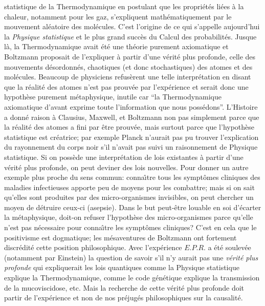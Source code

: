 statistique de la Thermodynamique  en postulant  que les propri\'et\'es
li\'ees \`a la chaleur, notamment pour les gaz, s'expliquent
math\'ematiquement par le mouvement al\'eatoire des mol\'ecules.  C'est
l'origine de ce qui s'appelle aujourd'hui la {\it Physique statistique} et 
le plus grand succ\`es du Calcul des probabilit\'es.  Jusque l\`a, la 
Thermodynamique avait \'et\'e une th\'eorie purement axiomatique et 
Boltzmann proposait de l'expliquer \`a partir d'une v\'erit\'e plus 
profonde,  celle des mouvements d\'esordonn\'es,  chaotiques (et donc 
stochastiques) des atomes et des mol\'ecules.  Beaucoup de physiciens 
refus\`erent une telle interpr\'etation en disant que la r\'ealit\'e des 
atomes n'est pas prouv\'ee par l'exp\'erience et serait donc une 
hypoth\`ese purement m\'etaphysique, inutile car ``la Thermodynamique 
axiomatique d'avant {} exprime toute l'information que nous 
poss\'edons''.  
\medskip 
L'Histoire a donn\'e raison \`a Clausius,  Maxwell,  et Boltzmann non
pas simplement parce que la r\'ealit\'e des atomes a fini par \^etre 
prouv\'ee,  mais surtout parce que l'hypoth\`ese statistique est
cr\'eatrice;  par exemple Planck n'aurait pas pu trouver l'explication
du rayonnement du corps noir s'il n'avait pas suivi un raisonnement de
Physique statistique.  Si on poss\`ede une interpr\'etation de lois
existantes \`a partir d'une v\'erit\'e plus profonde,  on peut deviner
des lois nouvelles. 
\medskip
Pour donner un autre exemple plus proche du sens commun: 
conna\^\i tre tous les sympt\^omes cliniques des maladies infectieuses
apporte peu de moyens pour les combattre;  mais si on sait qu'elles
sont produites par des micro-organismes invisibles,  on peut chercher
un moyen de d\'etruire ceux-ci (asepsie).  Dans le but peut-\^etre 
louable en soi d'\'ecarter la m\'etaphysique,  doit-on refuser 
l'hypoth\`ese des micro-organismes parce qu'elle n'est pas n\'ecessaire 
pour conna\^\i tre les sympt\^omes cliniques?  C'est en cela que le 
posi\-ti\-visme est dogmatique;  les m\'esaventures de Boltzmann ont 
fortement discr\'edit\'e cette position philosophique.     
\medskip  
Avec l'exp\'erience $E.P.R.$ a \'et\'e soulev\'ee (notamment par Einstein) 
la question de savoir s'il n'y aurait pas une {\it v\'erit\'e plus profonde} 
qui expliquerait les lois quantiques comme la Physique statistique 
explique la Thermodynamique,  comme le code g\'en\'etique explique la  
transmission de la mucoviscidose, etc.  Mais la recherche de cette 
v\'erit\'e plus profonde doit partir de l'exp\'erience et non de nos 
pr\'ejug\'es philosophiques sur la causalit\'e.  
